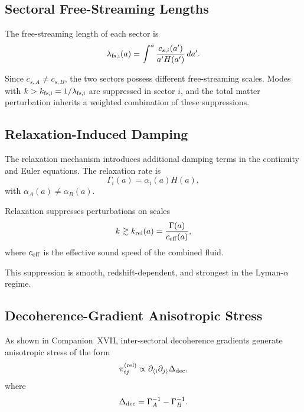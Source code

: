 \documentclass[11pt,a4paper]{article}
\begin{document}
\subsection{Sectoral Free-Streaming Lengths}

The free-streaming length of each sector is
\begin{equation}
\lambda_{\rm fs,i}(a)
= \int^a \frac{c_{s,i}(a')}{a'H(a')} \, da'.
\end{equation}

Since $c_{s,A} \neq c_{s,B}$, the two sectors possess different free-streaming scales. Modes
with $k > k_{\rm fs,i} = 1/\lambda_{\rm fs,i}$ are suppressed in sector $i$, and the total matter
perturbation inherits a weighted combination of these suppressions.

\subsection{Relaxation-Induced Damping}

The relaxation mechanism introduces additional damping terms in the continuity and Euler
equations. The relaxation rate is
\begin{equation}
\Gamma_i(a) = \alpha_i(a) H(a),
\end{equation}
with $\alpha_A(a) \neq \alpha_B(a)$.

Relaxation suppresses perturbations on scales
\begin{equation}
k \gtrsim k_{\rm rel}(a)
= \frac{\Gamma(a)}{c_{\rm eff}(a)},
\end{equation}
where $c_{\rm eff}$ is the effective sound speed of the combined fluid.

This suppression is smooth, redshift-dependent, and strongest in the Lyman-$\alpha$ regime.

\subsection{Decoherence-Gradient Anisotropic Stress}

As shown in Companion~XVII, inter-sectoral decoherence gradients generate anisotropic
stress of the form
\begin{equation}
\pi_{ij}^{\rm (rel)} \propto
\partial_{\langle i}\partial_{j\rangle} \Delta_{\rm dec},
\end{equation}
where
\begin{equation}
\Delta_{\rm dec}
= \Gamma_A^{-1} - \Gamma_B^{-1}.
\end{equation}
\end{document}
